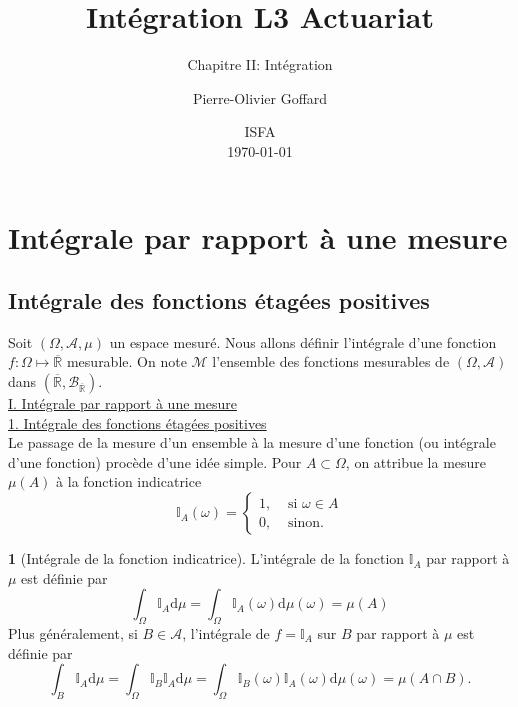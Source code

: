 \documentclass[8pt,notheorems]{beamer}
\title[]{Intégration L3 Actuariat}
\subtitle{Chapitre II: Intégration}
\author{Pierre-Olivier Goffard}
\institute{
	   Université de Lyon 1\\
	ISFA\\
	   \texttt{pierre-olivier.goffard@univ-lyon1.fr}
	  }
\date{
ISFA\\
\today}
\def \Om{\Omega}
\def \om{\omega}
\theoremstyle{definition}
\newtheorem{definition}{\translate{Definition}}
\theoremstyle{example}
\newtheorem{remark}{\translate{Remarque}}
\theoremstyle{mystyle}
\theoremstyle{plain}
\begin{document}
\frame{\titlepage}


\section{Intégrale par rapport à une mesure}
\subsection{Intégrale des fonctions étagées positives}
\begin{frame}[allowframebreaks]
Soit $(\Om,\mathcal{A}, \mu)$ un espace mesuré. Nous allons définir l'intégrale d'une fonction $f:\Om\mapsto\overline{\mathbb{R}}$ mesurable. On note $\mathcal{M}$ l'ensemble des fonctions mesurables de $(\Om,\mathcal{A})$ dans $(\overline{\mathbb{R}},\mathcal{B}_{\overline{\mathbb{R}}})$.\\
\underline{I. Intégrale par rapport à une mesure}\\

\underline{1. Intégrale des fonctions étagées positives}\\
Le passage de la mesure d'un ensemble à la mesure d'une fonction (ou intégrale d'une fonction) procède d'une idée simple. Pour $A\subset\Om$, on attribue la mesure $\mu(A)$ à la fonction indicatrice
$$
\mathbb{I}_{A}(\om)=\begin{cases}1,&\text{ si }\om\in A\\
0,&\text{ sinon}.
\end{cases}
$$
\begin{definition}[Intégrale de la fonction indicatrice]
L'intégrale de la fonction $\mathbb{I}_{A}$ par rapport à $\mu$ est définie par
$$
\int_{\Om} \mathbb{I}_A\text{d}\mu=\int_{\Om} \mathbb{I}_A(\om)\text{d}\mu(\om)=\mu(A)
$$
Plus généralement, si $B\in\mathcal{A}$, l'intégrale de $f=\mathbb{I}_A$ sur $B$ par rapport à $\mu$ est définie par
$$
\int_{B}\mathbb{I}_A\text{d}\mu=\int_{\Om}\mathbb{I}_B\mathbb{I}_A\text{d}\mu=\int_{\Om}\mathbb{I}_B(\om)\mathbb{I}_A(\om)\text{d}\mu(\om)=\mu(A\cap B).
$$
\end{definition}
\end{frame}
\end{document}
